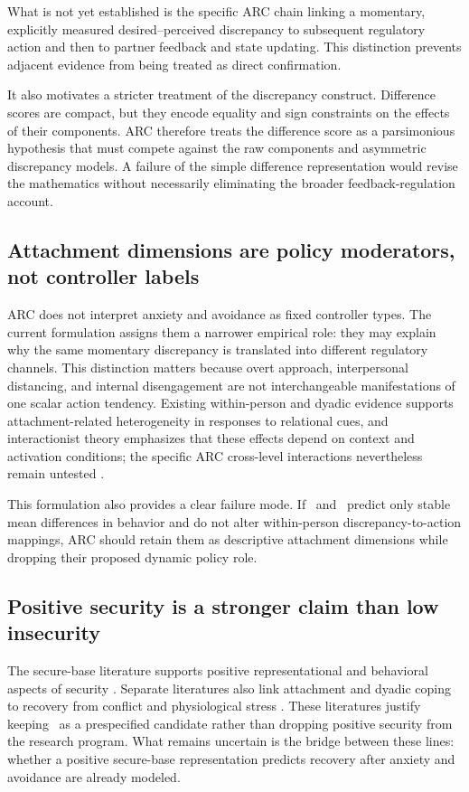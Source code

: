 What is not yet established is the specific ARC chain linking a momentary, explicitly measured desired--perceived discrepancy to subsequent regulatory action and then to partner feedback and state updating. This distinction prevents adjacent evidence from being treated as direct confirmation.

It also motivates a stricter treatment of the discrepancy construct. Difference scores are compact, but they encode equality and sign constraints on the effects of their components. ARC therefore treats the difference score as a parsimonious hypothesis that must compete against the raw components and asymmetric discrepancy models. A failure of the simple difference representation would revise the mathematics without necessarily eliminating the broader feedback-regulation account.

\subsection{Attachment dimensions are policy moderators, not controller labels}

ARC does not interpret anxiety and avoidance as fixed controller types. The current formulation assigns them a narrower empirical role: they may explain why the same momentary discrepancy is translated into different regulatory channels. This distinction matters because overt approach, interpersonal distancing, and internal disengagement are not interchangeable manifestations of one scalar action tendency. Existing within-person and dyadic evidence supports attachment-related heterogeneity in responses to relational cues, and interactionist theory emphasizes that these effects depend on context and activation conditions; the specific ARC cross-level interactions nevertheless remain untested \parencite{campbell2011interactionist,sadikaj2011dynamics,xie2025interdependence,carnelley2025phubbing}.

This formulation also provides a clear failure mode. If \Anx\ and \Avo\ predict only stable mean differences in behavior and do not alter within-person discrepancy-to-action mappings, ARC should retain them as descriptive attachment dimensions while dropping their proposed dynamic policy role.

\subsection{Positive security is a stronger claim than low insecurity}

The secure-base literature supports positive representational and behavioral aspects of security \parencite{waters2006workingmodels,waters2019securebase,crowell2002securebase}. Separate literatures also link attachment and dyadic coping to recovery from conflict and physiological stress \parencite{powers2006cortisol,meuwly2012cortisol,salvatore2011recovery}. These literatures justify keeping \Sec\ as a prespecified candidate rather than dropping positive security from the research program. What remains uncertain is the bridge between these lines: whether a positive secure-base representation predicts recovery after anxiety and avoidance are already modeled.


